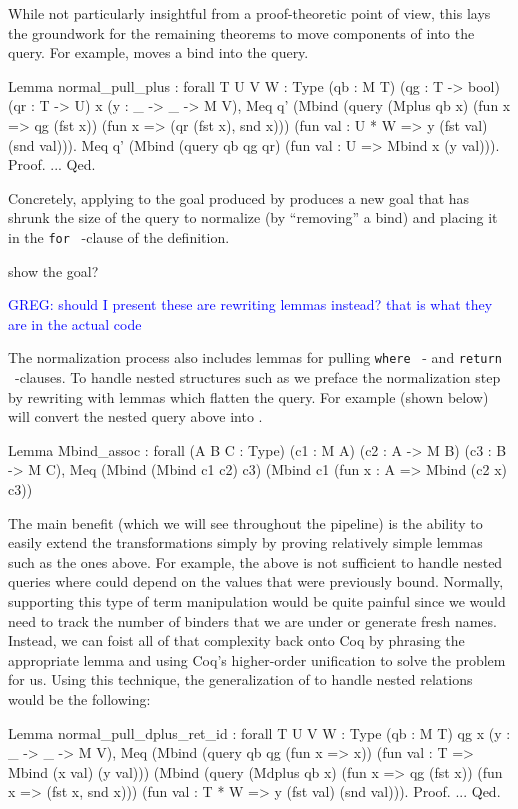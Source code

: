 \documentclass[preprint]{sigplanconf}
\newcommand{\FOR}{{\tt for} \ }
\newcommand{\WHERE}{{\tt where} \ }
\newcommand{\RETURN}{{\tt return} \ }
\newcommand{\greg}[1]{\textcolor{blue}{GREG: #1}}
\begin{document}
While not particularly insightful from a proof-theoretic point of view, this lays the groundwork for the remaining theorems to move components of  into the query.
For example,  moves a bind into the query.
\begin{coq}
Lemma normal_pull_plus
: forall {T U V W : Type} (qb : M T) (qg : T -> bool) (qr : T -> U) x (y : _ -> _ -> M V),
  Meq q'
      (Mbind (query (Mplus qb x) (fun x => qg (fst x)) (fun x => (qr (fst x), snd x)))
             (fun val : U * W => y (fst val) (snd val))).
  Meq q'
      (Mbind (query qb qg qr)
             (fun val : U => Mbind x (y val))).
Proof. ... Qed.
\end{coq}
Concretely, applying  to the goal produced by  produces a new goal that has shrunk the size of the query to normalize (by ``removing'' a bind) and placing it in the \FOR-clause of the  definition.
\begin{coq}
show the goal?
\end{coq}
\greg{should I present these are rewriting lemmas instead? that is what they are in the actual code}

The normalization process also includes lemmas for pulling \WHERE- and \RETURN-clauses.
To handle nested structures such as  we preface the normalization step by rewriting with lemmas which flatten the query.
For example  (shown below) will convert the nested query above into .
\begin{coq}
Lemma Mbind_assoc
: forall (A B C : Type) (c1 : M A) (c2 : A -> M B)
         (c3 : B -> M C),
  Meq (Mbind (Mbind c1 c2) c3)
      (Mbind c1 (fun x : A => Mbind (c2 x) c3))
\end{coq}

The main benefit (which we will see throughout the pipeline) is the ability to easily extend the transformations simply by proving relatively simple lemmas such as the ones above.
For example, the above  is not sufficient to handle nested queries where  could depend on the values that were previously bound.
Normally, supporting this type of term manipulation would be quite painful since we would need to track the number of binders that we are under or generate fresh names.
Instead, we can foist all of that complexity back onto Coq by phrasing the appropriate lemma and using Coq's higher-order unification to solve the problem for us.
Using this technique, the generalization of  to handle nested relations would be the following:
\begin{coq}
Lemma normal_pull_dplus_ret_id
: forall {T U V W : Type} (qb : M T) qg x (y : _ -> _ -> M V),
  Meq (Mbind (query qb qg (fun x => x))
             (fun val : T => Mbind (x val) (y val)))
      (Mbind (query (Mdplus qb x) (fun x => qg (fst x)) (fun x => (fst x, snd x)))
             (fun val : T * W => y (fst val) (snd val))).
Proof. ... Qed.
\end{coq}
\end{document}

